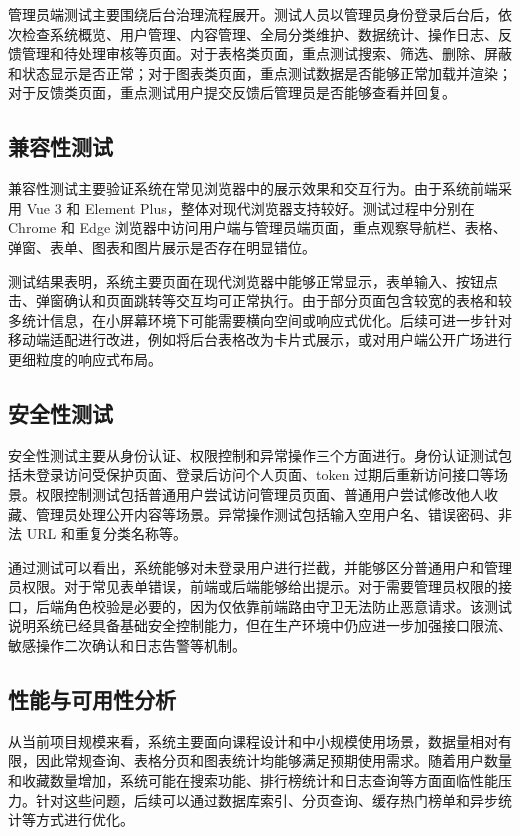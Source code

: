 \documentclass[12pt,a4paper]{ctexart}
\begin{document}
管理员端测试主要围绕后台治理流程展开。测试人员以管理员身份登录后台后，依次检查系统概览、用户管理、内容管理、全局分类维护、数据统计、操作日志、反馈管理和待处理审核等页面。对于表格类页面，重点测试搜索、筛选、删除、屏蔽和状态显示是否正常；对于图表类页面，重点测试数据是否能够正常加载并渲染；对于反馈类页面，重点测试用户提交反馈后管理员是否能够查看并回复。

\subsection{兼容性测试}
兼容性测试主要验证系统在常见浏览器中的展示效果和交互行为。由于系统前端采用 Vue 3 和 Element Plus，整体对现代浏览器支持较好。测试过程中分别在 Chrome 和 Edge 浏览器中访问用户端与管理员端页面，重点观察导航栏、表格、弹窗、表单、图表和图片展示是否存在明显错位。

测试结果表明，系统主要页面在现代浏览器中能够正常显示，表单输入、按钮点击、弹窗确认和页面跳转等交互均可正常执行。由于部分页面包含较宽的表格和较多统计信息，在小屏幕环境下可能需要横向空间或响应式优化。后续可进一步针对移动端适配进行改进，例如将后台表格改为卡片式展示，或对用户端公开广场进行更细粒度的响应式布局。

\subsection{安全性测试}
安全性测试主要从身份认证、权限控制和异常操作三个方面进行。身份认证测试包括未登录访问受保护页面、登录后访问个人页面、token 过期后重新访问接口等场景。权限控制测试包括普通用户尝试访问管理员页面、普通用户尝试修改他人收藏、管理员处理公开内容等场景。异常操作测试包括输入空用户名、错误密码、非法 URL 和重复分类名称等。

通过测试可以看出，系统能够对未登录用户进行拦截，并能够区分普通用户和管理员权限。对于常见表单错误，前端或后端能够给出提示。对于需要管理员权限的接口，后端角色校验是必要的，因为仅依靠前端路由守卫无法防止恶意请求。该测试说明系统已经具备基础安全控制能力，但在生产环境中仍应进一步加强接口限流、敏感操作二次确认和日志告警等机制。

\subsection{性能与可用性分析}
从当前项目规模来看，系统主要面向课程设计和中小规模使用场景，数据量相对有限，因此常规查询、表格分页和图表统计均能够满足预期使用需求。随着用户数量和收藏数量增加，系统可能在搜索功能、排行榜统计和日志查询等方面面临性能压力。针对这些问题，后续可以通过数据库索引、分页查询、缓存热门榜单和异步统计等方式进行优化。
\end{document}
